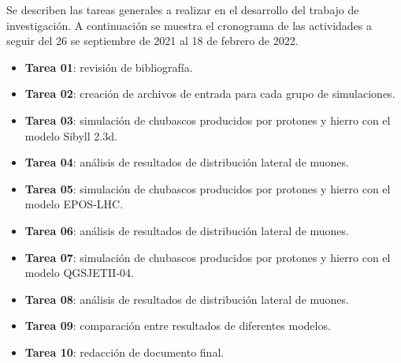 Se describen las tareas generales a realizar en el desarrollo del trabajo de investigaci\'on. A continuaci\'on se muestra el cronograma de las actividades a seguir del 26 se septiembre de 2021 al 18 de febrero de 2022.

\begin{itemize}
\item \textbf{Tarea 01}: revisión de bibliografía.
	
\item \textbf{Tarea 02}: creación de archivos de entrada para cada grupo de simulaciones.

\item \textbf{Tarea 03}: simulación de chubascos producidos por protones y hierro con el modelo Sibyll 2.3d.

\item \textbf{Tarea 04}: análisis de resultados de distribuci\'on lateral de muones.

\item \textbf{Tarea 05}: simulación de chubascos producidos por protones y hierro con el modelo EPOS-LHC.

\item \textbf{Tarea 06}: análisis de resultados de distribuci\'on lateral de muones.

\item \textbf{Tarea 07}: simulación de chubascos producidos por protones y hierro con el modelo QGSJETII-04.

\item \textbf{Tarea 08}: análisis de resultados de distribuci\'on lateral de muones.

\item \textbf{Tarea 09}: comparación entre resultados de diferentes modelos.

\item \textbf{Tarea 10}: redacción de documento final.
\end{itemize}


